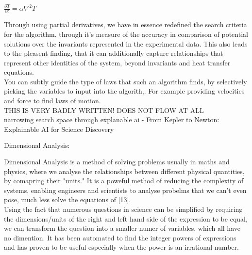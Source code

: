 \documentclass{article}
\begin{document}
\begin{center}
$\frac{\partial T}{\partial t} = \alpha \nabla^2 T$
\end{center}



Through using partial derivatives, we have in essence redefined the search criteria for the algorithm, through it's measure of the accuracy in comparison of potential solutions over the invariants represented in the experimental data. This also leads to the pleasent finding, that it can additionally capture relationships that represent other identities of the system, beyond invariants and heat transfer equations. \\ 

You can subtly guide the type of laws that such an algorithm finds, by selectively picking the variables to input into the algorith,. For example providing velocities and force to find laws of motion. \\ 

THIS IS VERY BADLY WRITTEN! DOES NOT FLOW AT ALL\\ 



narrowing search space through explanable ai - From Kepler to Newton: Explainable AI for Science Discovery\\

\begin{center} 
  {\Large Dimensional Analysis:}
\end{center}

Dimensional Analysis is a method of solving problems usually in maths and physics, where we analyse the relationships between different physical quantities, by comapring their "units." It is a poweful method of reducing the complexity of systems, enabling engineers and scientists to analyse probelms that we can't even pose, much less solve the equations of [13]. \\

Using the fact that numerous questions in science can be simplified by requiring the dimensions/units of the right and left hand side of the expression to be equal, we can transform the question into a smaller numer of variables, which all have no dimention. It has been automated to find the integer powers of expressions and has proven to be useful especially when the power is an irrational number.\\ 
\end{document}
